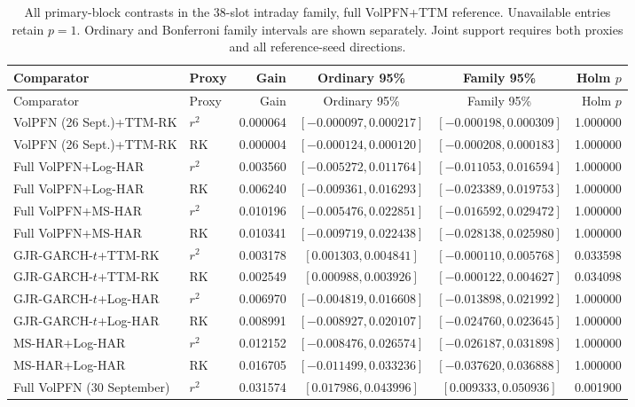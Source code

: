 \begingroup\footnotesize\setlength{\tabcolsep}{3pt}
\begin{longtable}{@{}>{\raggedright\arraybackslash}p{2.7cm}lrccr@{}}
\caption[Complete realised-risk inference]{All primary-block contrasts in the 38-slot intraday family, full VolPFN+TTM reference. Unavailable entries retain $p=1$. Ordinary and Bonferroni family intervals are shown separately. Joint support requires both proxies and all reference-seed directions.}\label{tab:new-intraday-inference}\\
\toprule
Comparator & Proxy & Gain & Ordinary 95\% & Family 95\% & Holm $p$ \\
\midrule\endfirsthead
\toprule
Comparator & Proxy & Gain & Ordinary 95\% & Family 95\% & Holm $p$ \\
\midrule\endhead
VolPFN (26 Sept.)+TTM-RK & $r^2$ & 0.000064 & $[-0.000097,0.000217]$ & $[-0.000198,0.000309]$ & 1.000000 \\
VolPFN (26 Sept.)+TTM-RK & RK & 0.000004 & $[-0.000124,0.000120]$ & $[-0.000208,0.000183]$ & 1.000000 \\
Full VolPFN+Log-HAR & $r^2$ & 0.003560 & $[-0.005272,0.011764]$ & $[-0.011053,0.016594]$ & 1.000000 \\
Full VolPFN+Log-HAR & RK & 0.006240 & $[-0.009361,0.016293]$ & $[-0.023389,0.019753]$ & 1.000000 \\
Full VolPFN+MS-HAR & $r^2$ & 0.010196 & $[-0.005476,0.022851]$ & $[-0.016592,0.029472]$ & 1.000000 \\
Full VolPFN+MS-HAR & RK & 0.010341 & $[-0.009719,0.022438]$ & $[-0.028138,0.025980]$ & 1.000000 \\
GJR-GARCH-$t$+TTM-RK & $r^2$ & 0.003178 & $[0.001303,0.004841]$ & $[-0.000110,0.005768]$ & 0.033598 \\
GJR-GARCH-$t$+TTM-RK & RK & 0.002549 & $[0.000988,0.003926]$ & $[-0.000122,0.004627]$ & 0.034098 \\
GJR-GARCH-$t$+Log-HAR & $r^2$ & 0.006970 & $[-0.004819,0.016608]$ & $[-0.013898,0.021992]$ & 1.000000 \\
GJR-GARCH-$t$+Log-HAR & RK & 0.008991 & $[-0.008927,0.020107]$ & $[-0.024760,0.023645]$ & 1.000000 \\
MS-HAR+Log-HAR & $r^2$ & 0.012152 & $[-0.008476,0.026574]$ & $[-0.026187,0.031898]$ & 1.000000 \\
MS-HAR+Log-HAR & RK & 0.016705 & $[-0.011499,0.033236]$ & $[-0.037620,0.036888]$ & 1.000000 \\
Full VolPFN (30 September) & $r^2$ & 0.031574 & $[0.017986,0.043996]$ & $[0.009333,0.050936]$ & 0.001900 \\

\end{longtable}
